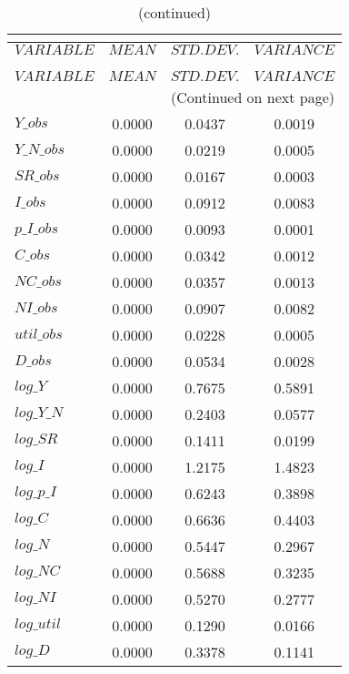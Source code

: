  
\begin{center}
\begin{longtable}{lccc} 
\caption{THEORETICAL MOMENTS}\\
 \label{Table:th_moments}\\
\toprule 
$VARIABLE   $	 & 	 $         MEAN$	 & 	 $    STD. DEV.$	 & 	 $     VARIANCE$\\
\midrule \endfirsthead 
\caption{(continued)}\\
 \toprule \\ 
$VARIABLE   $	 & 	 $         MEAN$	 & 	 $    STD. DEV.$	 & 	 $     VARIANCE$\\
\midrule \endhead 
\midrule \multicolumn{4}{r}{(Continued on next page)} \\ \bottomrule \endfoot 
\bottomrule \endlastfoot 
$Y\_obs     $	 & 	       0.0000	 & 	       0.0437	 & 	       0.0019 \\ 
$Y\_N\_obs  $	 & 	       0.0000	 & 	       0.0219	 & 	       0.0005 \\ 
$SR\_obs    $	 & 	       0.0000	 & 	       0.0167	 & 	       0.0003 \\ 
$I\_obs     $	 & 	       0.0000	 & 	       0.0912	 & 	       0.0083 \\ 
$p\_I\_obs  $	 & 	       0.0000	 & 	       0.0093	 & 	       0.0001 \\ 
$C\_obs     $	 & 	       0.0000	 & 	       0.0342	 & 	       0.0012 \\ 
$NC\_obs    $	 & 	       0.0000	 & 	       0.0357	 & 	       0.0013 \\ 
$NI\_obs    $	 & 	       0.0000	 & 	       0.0907	 & 	       0.0082 \\ 
$util\_obs  $	 & 	       0.0000	 & 	       0.0228	 & 	       0.0005 \\ 
$D\_obs     $	 & 	       0.0000	 & 	       0.0534	 & 	       0.0028 \\ 
$log\_Y     $	 & 	       0.0000	 & 	       0.7675	 & 	       0.5891 \\ 
$log\_Y\_N  $	 & 	       0.0000	 & 	       0.2403	 & 	       0.0577 \\ 
$log\_SR    $	 & 	       0.0000	 & 	       0.1411	 & 	       0.0199 \\ 
$log\_I     $	 & 	       0.0000	 & 	       1.2175	 & 	       1.4823 \\ 
$log\_p\_I  $	 & 	       0.0000	 & 	       0.6243	 & 	       0.3898 \\ 
$log\_C     $	 & 	       0.0000	 & 	       0.6636	 & 	       0.4403 \\ 
$log\_N     $	 & 	       0.0000	 & 	       0.5447	 & 	       0.2967 \\ 
$log\_NC    $	 & 	       0.0000	 & 	       0.5688	 & 	       0.3235 \\ 
$log\_NI    $	 & 	       0.0000	 & 	       0.5270	 & 	       0.2777 \\ 
$log\_util  $	 & 	       0.0000	 & 	       0.1290	 & 	       0.0166 \\ 
$log\_D     $	 & 	       0.0000	 & 	       0.3378	 & 	       0.1141 \\ 
\end{longtable}
 \end{center}
